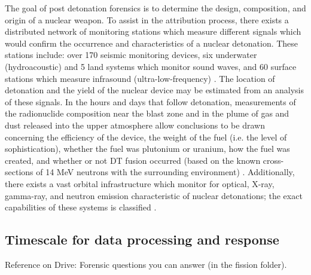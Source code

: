 \documentclass{report}
\begin{document}
The goal of post detonation forensics is to determine the design, composition, and origin of a nuclear weapon. To assist in the attribution process, there exists a distributed network of monitoring stations which measure different signals which would confirm the occurrence and characteristics of a nuclear detonation. These stations include: over 170 seismic monitoring devices, six underwater (hydroacoustic) and 5 land systems which monitor sound waves, and 60 surface stations which measure infrasound (ultra-low-frequency) \cite{Lane2012}. The location of detonation and the yield of the nuclear device may be estimated from an analysis of these signals. In the hours and days that follow detonation, measurements of the radionuclide composition near the blast zone and in the plume of gas and dust released into the upper atmosphere allow conclusions to be drawn concerning the efficiency of the device, the weight of the fuel (i.e. the level of sophistication), whether the fuel was plutonium or uranium, how the fuel was created, and whether or not DT fusion occurred (based on the known cross-sections of 14 MeV neutrons with the surrounding environment) \cite{Davis2011}. Additionally, there exists a vast orbital infrastructure which monitor for optical, X-ray, gamma-ray, and neutron emission characteristic of nuclear detonations; the exact capabilities of these systems is classified \cite{1446400}. 

\subsection{Timescale for data processing and response}

Reference on Drive: Forensic questions you can answer (in the fission folder).
\end{document}
